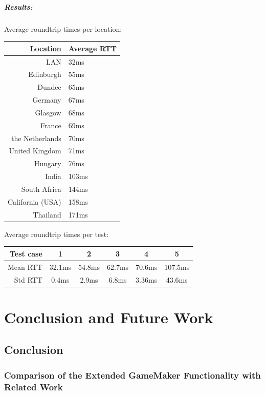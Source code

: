 \documentclass[bsc,frontabs,twoside,singlespacing,parskip,deptreport]{infthesis}     %
\begin{document}
\paragraph*{Results:}Average roundtrip times per location:
\begin{center}
  \begin{tabular}{ r | l }
Location		& Average RTT \\ \hline\hline
LAN				& 32ms	\\
Edinburgh		& 55ms	\\
Dundee			& 65ms	\\
Germany			& 67ms	\\
Glasgow			& 68ms	\\
France			& 69ms	\\
the Netherlands	& 70ms	\\
United Kingdom	& 71ms	\\
Hungary			& 76ms	\\
India			& 103ms	\\
South Africa	& 144ms	\\
California (USA)& 158ms	\\
Thailand		& 171ms	\\
  \end{tabular}
\end{center}

Average roundtrip times per test:
\begin{center}
  \begin{tabular}{ | r || c | c | c | c | c |}
    \hline
    Test case 		& 1 		& 2 		& 3 		& 4 		& 5 		\\ \hline\hline
    Mean RTT 		& 32.1ms 	& 54.8ms 	& 62.7ms 	& 70.6ms 	& 107.5ms	\\ \hline
    Std RTT			& 0.4ms		& 2.9ms		& 6.8ms		& 3.36ms	& 43.6ms	\\ \hline
  \end{tabular}
\end{center}



\chapter{Conclusion and Future Work}
\section{Conclusion}
\subsection{Comparison of the Extended GameMaker Functionality with Related Work}
\end{document}
